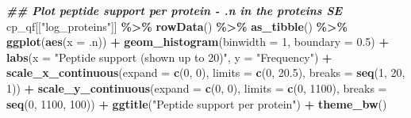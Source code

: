 \documentclass[9pt,a4paper,]{extarticle}
\newenvironment{Shaded}{\begin{snugshade}}{\end{snugshade}}
\newcommand{\AttributeTok}[1]{\textcolor[rgb]{0.13,0.29,0.53}{#1}}
\newcommand{\DecValTok}[1]{\textcolor[rgb]{0.00,0.00,0.81}{#1}}
\newcommand{\DocumentationTok}[1]{\textcolor[rgb]{0.56,0.35,0.01}{\textbf{\textit{#1}}}}
\newcommand{\FloatTok}[1]{\textcolor[rgb]{0.00,0.00,0.81}{#1}}
\newcommand{\FunctionTok}[1]{\textcolor[rgb]{0.13,0.29,0.53}{\textbf{#1}}}
\newcommand{\NormalTok}[1]{#1}
\newcommand{\SpecialCharTok}[1]{\textcolor[rgb]{0.81,0.36,0.00}{\textbf{#1}}}
\newcommand{\StringTok}[1]{\textcolor[rgb]{0.31,0.60,0.02}{#1}}
\begin{document}
\begin{Shaded}
\begin{Highlighting}[]
\DocumentationTok{\#\# Plot peptide support per protein {-} .n in the proteins SE}
\NormalTok{cp\_qf[[}\StringTok{"log\_proteins"}\NormalTok{]] }\SpecialCharTok{\%\textgreater{}\%}
  \FunctionTok{rowData}\NormalTok{() }\SpecialCharTok{\%\textgreater{}\%}
  \FunctionTok{as\_tibble}\NormalTok{() }\SpecialCharTok{\%\textgreater{}\%}
  \FunctionTok{ggplot}\NormalTok{(}\FunctionTok{aes}\NormalTok{(}\AttributeTok{x =}\NormalTok{ .n)) }\SpecialCharTok{+}
  \FunctionTok{geom\_histogram}\NormalTok{(}\AttributeTok{binwidth =} \DecValTok{1}\NormalTok{, }\AttributeTok{boundary =} \FloatTok{0.5}\NormalTok{) }\SpecialCharTok{+}
  \FunctionTok{labs}\NormalTok{(}\AttributeTok{x =} \StringTok{"Peptide support (shown up to 20)"}\NormalTok{,}
       \AttributeTok{y =} \StringTok{"Frequency"}\NormalTok{) }\SpecialCharTok{+}
  \FunctionTok{scale\_x\_continuous}\NormalTok{(}\AttributeTok{expand =} \FunctionTok{c}\NormalTok{(}\DecValTok{0}\NormalTok{, }\DecValTok{0}\NormalTok{),}
                     \AttributeTok{limits =} \FunctionTok{c}\NormalTok{(}\DecValTok{0}\NormalTok{, }\FloatTok{20.5}\NormalTok{),}
                     \AttributeTok{breaks =} \FunctionTok{seq}\NormalTok{(}\DecValTok{1}\NormalTok{, }\DecValTok{20}\NormalTok{, }\DecValTok{1}\NormalTok{)) }\SpecialCharTok{+}
  \FunctionTok{scale\_y\_continuous}\NormalTok{(}\AttributeTok{expand =} \FunctionTok{c}\NormalTok{(}\DecValTok{0}\NormalTok{, }\DecValTok{0}\NormalTok{),}
                     \AttributeTok{limits =} \FunctionTok{c}\NormalTok{(}\DecValTok{0}\NormalTok{, }\DecValTok{1100}\NormalTok{),}
                     \AttributeTok{breaks =} \FunctionTok{seq}\NormalTok{(}\DecValTok{0}\NormalTok{, }\DecValTok{1100}\NormalTok{, }\DecValTok{100}\NormalTok{)) }\SpecialCharTok{+}
  \FunctionTok{ggtitle}\NormalTok{(}\StringTok{"Peptide support per protein"}\NormalTok{) }\SpecialCharTok{+}
  \FunctionTok{theme\_bw}\NormalTok{()}
\end{Highlighting}
\end{Shaded}
\end{document}
